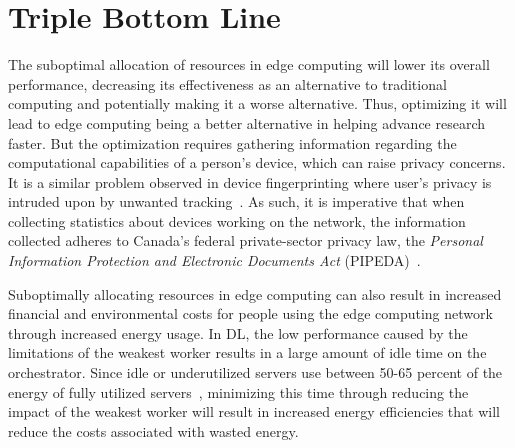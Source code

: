 \documentclass[../mthe-493-project-proposal.tex]{subfiles}
\begin{document}
    \section{Triple Bottom Line}
    The suboptimal allocation of resources in edge computing will lower its overall performance, decreasing its effectiveness as an alternative to traditional computing and potentially making it a worse alternative. Thus, optimizing it will lead to edge computing being a better alternative in helping advance research faster. But the optimization requires gathering information regarding the computational capabilities of a person's device, which can raise privacy concerns. It is a similar problem observed in device fingerprinting where user's privacy is intruded upon by unwanted tracking~\cite{laperdrix_browser_2020}. As such, it is imperative that when collecting statistics about devices working on the network, the information collected adheres to Canada’s federal private-sector privacy law, the \textit{Personal Information Protection and Electronic Documents Act} (PIPEDA)~\cite{noauthor_privacy_nodate}.

    Suboptimally allocating resources in edge computing can also result in increased financial and environmental costs for people using the edge computing network through increased energy usage. In DL, the low performance caused by the limitations of the weakest worker results in a large amount of idle time on the orchestrator. Since idle or underutilized servers use between 50-65 percent of the energy of fully utilized servers~\cite{noauthor_triple_nodate}, minimizing this time through reducing the impact of the weakest worker will result in increased energy efficiencies that will reduce the costs associated with wasted energy.
\end{document}
